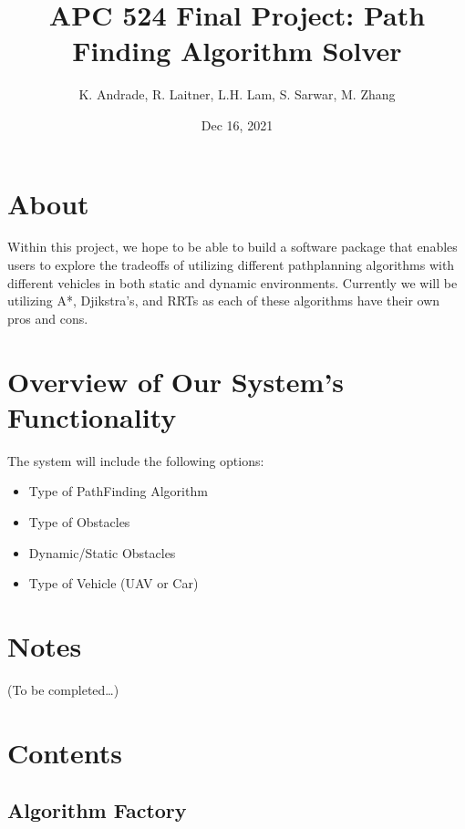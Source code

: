 \documentclass[letterpaper,10pt,english]{sphinxmanual}
\title{APC 524 Final Project: Path Finding Algorithm Solver}
\date{Dec 16, 2021}
\author{K.\@{} Andrade, R.\@{} Laitner, L.H.\@{} Lam, S.\@{} Sarwar, M.\@{} Zhang}
\begin{document}
\pagestyle{empty}
\sphinxmaketitle
\pagestyle{plain}
\sphinxtableofcontents
\pagestyle{normal}
\label{\detokenize{index::doc}}



\chapter{About}
\label{\detokenize{index:about}}
\sphinxAtStartPar
Within this project, we hope to be able to build a software package that enables
users to explore the tradeoffs of utilizing different path\sphinxhyphen{}planning algorithms
with different vehicles in both static and dynamic environments. Currently we will
be utilizing A*, Djikstra’s, and RRTs as each of these algorithms have their own
pros and cons.


\chapter{Overview of Our System’s Functionality}
\label{\detokenize{index:overview-of-our-system-s-functionality}}
\sphinxAtStartPar
The system will include the following options:
\begin{itemize}
\item {} 
\sphinxAtStartPar
Type of Path\sphinxhyphen{}Finding Algorithm

\item {} 
\sphinxAtStartPar
Type of Obstacles

\item {} 
\sphinxAtStartPar
Dynamic/Static Obstacles

\item {} 
\sphinxAtStartPar
Type of Vehicle (UAV or Car)

\end{itemize}


\chapter{Notes}
\label{\detokenize{index:notes}}
\sphinxAtStartPar
(To be completed…)


\chapter{Contents}
\label{\detokenize{index:contents}}

\section{Algorithm Factory}
\label{\detokenize{test:algorithm-factory}}\label{\detokenize{test::doc}}
\end{document}
